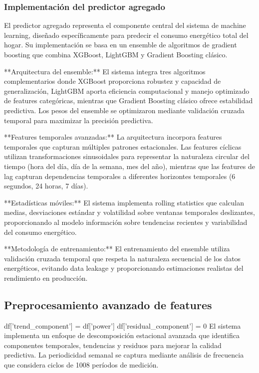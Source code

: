 \subsubsection{Implementación del predictor agregado}

El predictor agregado representa el componente central del sistema de machine learning, diseñado específicamente para predecir el consumo energético total del hogar. Su implementación se basa en un ensemble de algoritmos de gradient boosting que combina XGBoost, LightGBM y Gradient Boosting clásico.

**Arquitectura del ensemble:** El sistema integra tres algoritmos complementarios donde XGBoost proporciona robustez y capacidad de generalización, LightGBM aporta eficiencia computacional y manejo optimizado de features categóricas, mientras que Gradient Boosting clásico ofrece estabilidad predictiva. Los pesos del ensemble se optimizaron mediante validación cruzada temporal para maximizar la precisión predictiva.

**Features temporales avanzadas:** La arquitectura incorpora features temporales que capturan múltiples patrones estacionales. Las features cíclicas utilizan transformaciones sinusoidales para representar la naturaleza circular del tiempo (hora del día, día de la semana, mes del año), mientras que las features de lag capturan dependencias temporales a diferentes horizontes temporales (6 segundos, 24 horas, 7 días).

**Estadísticas móviles:** El sistema implementa rolling statistics que calculan medias, desviaciones estándar y volatilidad sobre ventanas temporales deslizantes, proporcionando al modelo información sobre tendencias recientes y variabilidad del consumo energético.

**Metodología de entrenamiento:** El entrenamiento del ensemble utiliza validación cruzada temporal que respeta la naturaleza secuencial de los datos energéticos, evitando data leakage y proporcionando estimaciones realistas del rendimiento en producción.

\subsection{Preprocesamiento avanzado de features}
                df['trend_component'] = df['power']
                df['residual_component'] = 0
El sistema implementa un enfoque de descomposición estacional avanzada que identifica componentes temporales, tendencias y residuos para mejorar la calidad predictiva. La periodicidad semanal se captura mediante análisis de frecuencia que considera ciclos de 1008 períodos de medición.

